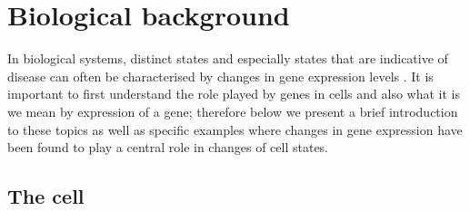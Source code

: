 \section{Biological background}
\label{sec:biol-backgr}

In biological systems, distinct states and especially states that are indicative of disease can often be characterised by changes in gene expression levels \citep{DeRisi:1997dw,Spellman:1998wj,Eisen:1999uw, Brown:1999bk}. It is important to first understand the role played by genes in cells and also what it is we mean by expression of a gene; therefore below we present a brief introduction to these topics as well as specific examples where changes in gene expression have been found to play a central role in changes of cell states. 

\subsection{The cell}
\label{sec:cell}

